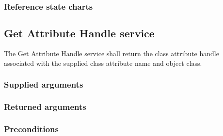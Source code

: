 \begin{compactstdpage}
    \subsubsection{Reference state charts}


    \subsection{Get Attribute Handle service}

    The Get Attribute Handle service shall return the class attribute handle associated with the supplied class attribute name and object class.

    \subsubsection{Supplied arguments}


    \subsubsection{Returned arguments}


    \subsubsection{Preconditions}

\end{compactstdpage}

\clearpage

